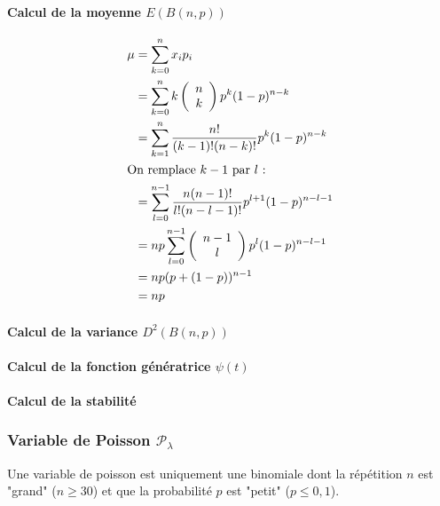 \paragraph{Calcul de la moyenne $E(B(n,p))$}
\begin{align*}
\mu &=\displaystyle\sum_{k=0}^{n} x_ip_i\\
    &=\displaystyle\sum_{k=0}^{n} k \left(\begin{array}{c}n\\k\end{array}\right)p^k(1-p)^{n-k}\\
    &=\displaystyle\sum_{k=1}^{n} \dfrac{n!}{(k-1)!(n-k)!}p^k(1-p)^{n-k}\\
\intertext{On remplace $k-1$ par $l$ :}
    &=\displaystyle\sum_{l=0}^{n-1}  \dfrac{n(n-1)!}{l!(n-l-1)!}p^{l+1}(1-p)^{n-l-1}\\
    &=np\displaystyle\sum_{l=0}^{n-1} \left(\begin{array}{c}n-1\\l\end{array}\right)p^{l}(1-p)^{n-l-1}\\
    &=np(p+(1-p))^{n-1}\\
    &=np\\
\end{align*}

\paragraph{Calcul de la variance $D^2(B(n,p))$}
\paragraph{Calcul de la fonction génératrice $\psi(t)$}
\paragraph{Calcul de la stabilité}

\newpage
\subsubsection{Variable de Poisson $\mathcal{P}_\lambda$}
Une variable de poisson est uniquement une binomiale dont la répétition $n$ est "grand" ($n\geq30$) et que la probabilité $p$ est "petit" ($p\leq0,1$).

